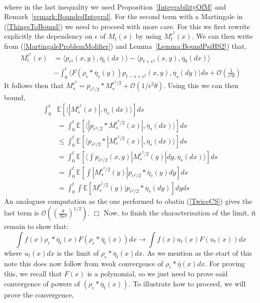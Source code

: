 \documentclass[12pt]{article}
\newenvironment {proof}{{\noindent\bf Proof }}{\hfill $\Box$ \medskip}
\newcommand{\IE}{\mathbb E}
\begin{document}
\begin{proof}
\begin{align}
\label{TwiceCS} \end{align}
where in the last inequality we used Proposition~\ref{IntegrabilityOfM} and Remark~\ref{remark:BoundedIntegral}. For the second term with a Martingale in (\ref{ThingsToBound}) we need to proceed with more care. For this we first rewrite explicitly the dependency on $\epsilon$ of $M_t(x)$ by using $M_t^{\varepsilon^2}(x)$. We can then write from (\ref{MartingaleProblemMolifier}) and Lemma~\ref{Lemma:BoundPsiHS2}) that,
\begin{align*}
 M_t^{\epsilon^2}(x) &= \langle p_{\epsilon^2}(x,y), \overline{\eta}_t(dx) \rangle - \langle p_{t + \epsilon^2}(x,y), \overline{\eta}_0(dx) \rangle \\ &- \int_0^t \langle F(\rho_\epsilon*\overline{\eta}_s(y)) p_{t-s+\epsilon^2}(x,y), \overline{\eta}_s(dy) \rangle ds + \mathcal{O}\left(\frac{1}{\epsilon^2 \theta} \right) \end{align*}
 It follows then that $M_s^{\epsilon^2}= p_{\epsilon^2/2}*M_s^{\epsilon^2/2} + \mathcal{O}\left(1/\epsilon^2 \theta\right)$. Using this we can then bound,
 \begin{align*}
\int_0^t &\IE[ \langle |M_s^{\epsilon^2}(x)|, \overline{\eta}_s(dx) \rangle ] ds \\ &= \int_0^t \IE[ \langle | p_{\epsilon^2/2}*M_s^{\epsilon^2/2}(x)|, \overline{\eta}_s(dx) \rangle] ds \\ & \leq  \int_0^t \IE[ \langle p_{\epsilon^2/2}*| M_s^{\epsilon^2/2}(x)|, \overline{\eta}_s(dx) \rangle] ds \\ &= \int_0^t \IE[ \langle \int p_{\epsilon^2/2}(x,y) |M_s^{\epsilon^2/2}(y)|dy, \overline{\eta}_s(dx) \rangle] ds \\ &= \int_0^t \IE[ \int |M_s^{\epsilon^2/2}(y)| p_{\epsilon^2/2}*\overline{\eta}_s(y) dy ] ds \\ &= \int_0^t \int \IE[ M_s^{\epsilon^2/2}(y)| p_{\epsilon^2/2} * \overline{\eta}_s(dy)] dy ds 
 \end{align*}
 An analogues computation as the one performed to obatin (\ref{TwiceCS}) gives the last term is $\mathcal{O}\left( \left( \frac{\theta}{N \epsilon^d} \right)^{1/2} \right)$.
 \end{proof}
Now, to finish the characterisation of the limit, it remain to show that:
\[ \int f(x) \rho_\epsilon * \overline{\eta}_t(x) F(\rho_\epsilon * \overline{\eta}_t(x)) dx \rightarrow \int f(x) u_t(x) F(u_t(x)) dx \]
where $u_t(x)dx$ is the limit of $\rho_\epsilon*\overline{\eta}_t(x)dx$. As we mention as the start of this note this does now follow from weak convergence of $\rho_\epsilon*\overline{\eta}(x)dx$. For proving this, we recall that $F(x)$ is a polynomial, so we just need to prove said convergence of powers of $(\rho_\epsilon*\overline{\eta}_t(x))$. To illustrate how to proceed, we will prove the convergence,
\end{document}
